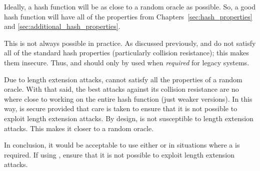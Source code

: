 Ideally, a \gls{hash function} will be as close to a
\gls{random oracle} as possible.
So, a good \gls{hash function} will have all of the properties
from Chapters~\ref{sec:hash_properties} and
\ref{sec:additional_hash_properties}.

This is not always possible in practice.
As discussed previously, \MDFive{} and \ShaOne{} do not satisfy
all of the standard hash properties (particularly collision resistance);
this makes them insecure.
Thus, \MDFive{} and \ShaOne{} should only by used
when \emph{required} for legacy systems.

Due to length extension attacks, \ShaTwo{} cannot satisfy
all the properties of a \gls{random oracle}.
With that said, the best attacks against its collision resistance
are no where close to working on the entire \gls{hash function}
(just weaker versions).
In this way, \ShaTwo{} is secure provided that care is taken
to ensure that it is not possible to exploit length extension attacks.
By design, \ShaThree{} is not susceptible to length extension attacks.
This makes it closer to a \gls{random oracle}.

In conclusion, it would be acceptable to use either \ShaTwo{} or \ShaThree{}
in situations where a  is required.
If using \ShaTwo{}, ensure that it is not possible
to exploit length extension attacks.
